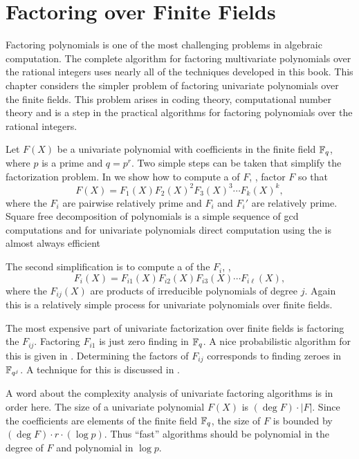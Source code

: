 
\chapter{Factoring over Finite Fields}
\label{Poly:FF:Factor:Chap}


Factoring polynomials is one of the most challenging problems in
algebraic computation.  The complete algorithm for factoring
multivariate polynomials over the rational integers uses nearly all of
the techniques developed in this book.  This chapter considers the
simpler problem of factoring univariate polynomials over the finite
fields.  This problem arises in coding theory, computational number 
theory and is a step in the practical algorithms for factoring 
polynomials over the rational integers.

Let $F(X)$ be a univariate polynomial with coefficients in the finite
field $\mathbb{F}_q$, where $p$ is a prime and $q=p^r$.  Two simple steps can
be taken that simplify the factorization problem.  In
 we show how to compute a  of $F$, \ie, factor $F$ so that
\[
F(X) = F_1(X) F_2(X)^2 F_3(X)^3 \cdots F_k(X)^k,
\]
where the $F_i$ are pairwise relatively prime and $F_i$ and $F_i'$ are
relatively prime.  Square free decomposition of polynomials is a
simple sequence of {\sc gcd} computations and for univariate
polynomials direct computation using the  is almost
always efficient

The second simplification is to compute a  of the $F_i$, \ie,
\[
F_i(X) = F_{i1}(X) F_{i2}(X) F_{i3}(X) \cdots F_{i\ell}(X),
\]
where the $F_{ij}(X)$ are products of irreducible polynomials of
degree $j$.  Again this is a relatively simple process for univariate
polynomials over finite fields.

The most expensive part of univariate factorization over finite fields
is factoring the $F_{ij}$.  Factoring $F_{i1}$ is just zero finding in
$\mathbb{F}_q$.  A nice probabilistic algorithm for this is given in
.  Determining the factors of $F_{ij}$
corresponds to finding zeroes in $\mathbb{F}_{q^j}$.  A technique for this is
discussed in .

A word about the complexity analysis of univariate factoring
algorithms is in order here.  The size of a univariate polynomial
$F(X)$ is $(\deg F) \cdot |F|$. Since the coefficients are elements of
the finite field $\mathbb{F}_q$, the size of $F$ is bounded by $(\deg F) \cdot
r \cdot (\log p)$.  Thus ``fast'' algorithms should be polynomial in
the degree of $F$ and polynomial in $\log p$.

